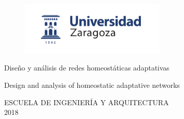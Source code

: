 \documentclass[a4paper,12pt,twoside,hidelinks,openright]{report}
\begin{document}

\begin{titlepage}

\vspace*{-4mm}
\begin{figure}[!h]
  \centering
	\includegraphics[width=69.62mm]{Imagenes/UnizarLogo}
\end{figure}

\vspace*{17mm}

\fontsize{28pt}{28pt}\selectfont
\begin{center}
\setlength{\fboxsep}{3.4mm}
\end{center}

\vspace*{18.7mm}


\fontsize{20pt}{20pt}\selectfont
\begin{center}
Diseño y análisis de redes homeostáticas adaptativas
\end{center}
\baselineskip 20pt
\begin{center}
Design and analysis of homeostatic adaptative networks
\end{center}

\vspace*{0cm}
\baselineskip 36pt
\begin{center}
\fontsize{12pt}{12pt}\selectfont
{}

\vspace*{3.65mm}
\fontsize{18pt}{18pt}\selectfont
{}
\vspace*{1cm}
\baselineskip 36pt
\fontsize{12pt}{12pt}\selectfont
{}
\vspace*{3.56mm}
\fontsize{14pt}{14pt}\selectfont
{}
\end{center}

\setcounter{footnote}{1}

\vspace*{16.45mm}
\fontsize{12pt}{12pt}\selectfont
\begin{center}
ESCUELA DE INGENIERÍA Y ARQUITECTURA\\
2018\\
\end{center}


\renewcommand{\thefootnote}{\arabic{footnote}}
\end{titlepage}
\newpage
\end{document}
